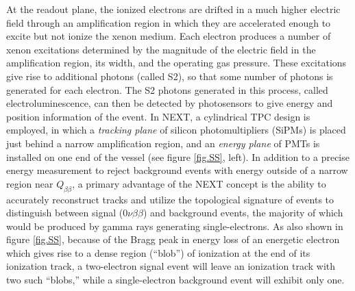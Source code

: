 \documentclass[11pt,a4paper]{article}
\begin{document}
At the readout plane, the ionized electrons are drifted in a much higher electric field through an amplification region in which they are accelerated enough to excite but not ionize the xenon medium.  Each electron produces a number of xenon excitations determined by the magnitude of the electric field in the amplification region, its width, and the operating gas pressure.  These excitations give rise to additional photons (called S2), so that some number of photons is generated for each electron.  The S2 photons generated in this process, called electroluminescence, can then be detected by photosensors to give energy and position information of the event. In NEXT, a cylindrical TPC design is employed, in which a \emph{tracking plane} of silicon photomultipliers (SiPMs) is placed just behind a narrow amplification region, and an \emph{energy plane} of PMTs is installed on one end of the vessel (see figure \ref{fig.SS}, left). In addition to a precise energy measurement to reject background events with energy outside of a narrow region near $Q_{\beta\beta}$, a primary advantage of the NEXT concept is the ability to accurately reconstruct tracks and utilize the topological signature of events to distinguish between signal ($0\nu\beta\beta$) and background events, the majority of which would be produced by gamma rays generating single-electrons.  As also shown in figure \ref{fig.SS}, because of the Bragg peak in energy loss of an energetic electron which gives rise to a dense region (``blob'') of ionization at the end of its ionization track, a two-electron signal event will leave an ionization track with two such ``blobs,'' while a single-electron background event will exhibit only one.
\end{document}
